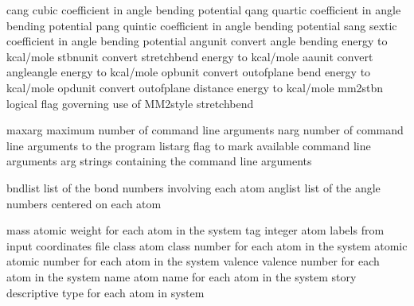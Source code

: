 \documentclass[letterpaper,11pt,english]{sphinxmanual}
\begin{document}

\begin{sphinxVerbatim}[commandchars=\\\{\}]
cang            cubic coefficient in angle bending potential
qang            quartic coefficient in angle bending potential
pang            quintic coefficient in angle bending potential
sang            sextic coefficient in angle bending potential
angunit         convert angle bending energy to kcal/mole
stbnunit        convert stretch\PYGZhy{}bend energy to kcal/mole
aaunit          convert angle\PYGZhy{}angle energy to kcal/mole
opbunit         convert out\PYGZhy{}of\PYGZhy{}plane bend energy to kcal/mole
opdunit         convert out\PYGZhy{}of\PYGZhy{}plane distance energy to kcal/mole
mm2stbn         logical flag governing use of MM2\PYGZhy{}style stretch\PYGZhy{}bend
\end{sphinxVerbatim}


\begin{sphinxVerbatim}[commandchars=\\\{\}]
maxarg          maximum number of command line arguments
narg            number of command line arguments to the program
listarg         flag to mark available command line arguments
arg             strings containing the command line arguments
\end{sphinxVerbatim}


\begin{sphinxVerbatim}[commandchars=\\\{\}]
bndlist         list of the bond numbers involving each atom
anglist         list of the angle numbers centered on each atom
\end{sphinxVerbatim}


\begin{sphinxVerbatim}[commandchars=\\\{\}]
mass            atomic weight for each atom in the system
tag             integer atom labels from input coordinates file
class           atom class number for each atom in the system
atomic          atomic number for each atom in the system
valence         valence number for each atom in the system
name            atom name for each atom in the system
story           descriptive type for each atom in system
\end{sphinxVerbatim}
\end{document}
